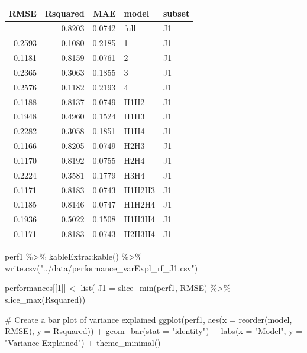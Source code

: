 \documentclass[
  letterpaper,
  DIV=11,
  numbers=noendperiod]{scrreprt}
\newenvironment{Shaded}{\begin{snugshade}}{\end{snugshade}}
\newcommand{\AttributeTok}[1]{\textcolor[rgb]{0.40,0.45,0.13}{#1}}
\newcommand{\CommentTok}[1]{\textcolor[rgb]{0.37,0.37,0.37}{#1}}
\newcommand{\DecValTok}[1]{\textcolor[rgb]{0.68,0.00,0.00}{#1}}
\newcommand{\FunctionTok}[1]{\textcolor[rgb]{0.28,0.35,0.67}{#1}}
\newcommand{\NormalTok}[1]{\textcolor[rgb]{0.00,0.23,0.31}{#1}}
\newcommand{\OtherTok}[1]{\textcolor[rgb]{0.00,0.23,0.31}{#1}}
\newcommand{\SpecialCharTok}[1]{\textcolor[rgb]{0.37,0.37,0.37}{#1}}
\newcommand{\StringTok}[1]{\textcolor[rgb]{0.13,0.47,0.30}{#1}}
\begin{document}
\begin{longtable}[]{@{}rrrll@{}}
\toprule\noalign{}
RMSE & Rsquared & MAE & model & subset \\
\midrule\noalign{}
\endhead
\bottomrule\noalign{}
\endlastfoot
0.1165 & 0.8203 & 0.0742 & full & J1 \\
0.2593 & 0.1080 & 0.2185 & 1 & J1 \\
0.1181 & 0.8159 & 0.0761 & 2 & J1 \\
0.2365 & 0.3063 & 0.1855 & 3 & J1 \\
0.2576 & 0.1182 & 0.2193 & 4 & J1 \\
0.1188 & 0.8137 & 0.0749 & H1H2 & J1 \\
0.1948 & 0.4960 & 0.1524 & H1H3 & J1 \\
0.2282 & 0.3058 & 0.1851 & H1H4 & J1 \\
0.1166 & 0.8205 & 0.0749 & H2H3 & J1 \\
0.1170 & 0.8192 & 0.0755 & H2H4 & J1 \\
0.2224 & 0.3581 & 0.1779 & H3H4 & J1 \\
0.1171 & 0.8183 & 0.0743 & H1H2H3 & J1 \\
0.1185 & 0.8146 & 0.0747 & H1H2H4 & J1 \\
0.1936 & 0.5022 & 0.1508 & H1H3H4 & J1 \\
0.1171 & 0.8183 & 0.0743 & H2H3H4 & J1 \\
\end{longtable}

\begin{Shaded}
\begin{Highlighting}[]
\NormalTok{perf1 }\SpecialCharTok{\%\textgreater{}\%} 
\NormalTok{    kableExtra}\SpecialCharTok{::}\FunctionTok{kable}\NormalTok{() }\SpecialCharTok{\%\textgreater{}\%} 
    \FunctionTok{write.csv}\NormalTok{(}\StringTok{"../data/performance\_varExpl\_rf\_J1.csv"}\NormalTok{)}

\NormalTok{performances[[}\DecValTok{1}\NormalTok{]] }\OtherTok{\textless{}{-}} \FunctionTok{list}\NormalTok{(}
    \AttributeTok{J1 =} \FunctionTok{slice\_min}\NormalTok{(perf1, RMSE) }\SpecialCharTok{\%\textgreater{}\%} 
    \FunctionTok{slice\_max}\NormalTok{(Rsquared))}


\CommentTok{\# Create a bar plot of variance explained}
\FunctionTok{ggplot}\NormalTok{(perf1, }\FunctionTok{aes}\NormalTok{(}\AttributeTok{x =} \FunctionTok{reorder}\NormalTok{(model, RMSE), }\AttributeTok{y =}\NormalTok{ Rsquared)) }\SpecialCharTok{+}
  \FunctionTok{geom\_bar}\NormalTok{(}\AttributeTok{stat =} \StringTok{"identity"}\NormalTok{) }\SpecialCharTok{+}
  \FunctionTok{labs}\NormalTok{(}\AttributeTok{x =} \StringTok{"Model"}\NormalTok{, }\AttributeTok{y =} \StringTok{"Variance Explained"}\NormalTok{) }\SpecialCharTok{+}
  \FunctionTok{theme\_minimal}\NormalTok{()}
\end{Highlighting}
\end{Shaded}
\end{document}
